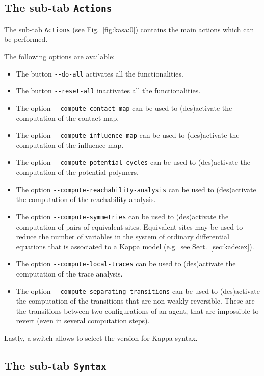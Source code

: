\documentclass[11pt]{book}
\begin{document}
\subsection{The sub-tab \texttt{Actions}}

The sub-tab \texttt{Actions} (see Fig.~\ref{fig:kasa:0}) contains the main actions which can be performed.

The following options are available:
\begin{itemize}
\item The button \texttt{-{}-do-all} activates all the functionalities.
\item The button \texttt{-{}-reset-all} inactivates all the functionalities.
\item The option \texttt{-{}-compute-contact-map} can be used to (des)activate the computation of the contact map.
\item The option \texttt{-{}-compute-influence-map} can be used to (des)activate the computation of the influence map.
\item The option \texttt{-{}-compute-potential-cycles} can be used to (des)activate the computation of the potential polymers.
\item The option \texttt{-{}-compute-reachability-analysis} can be used to (des)activate the computation of the reachability analysis.
\item The option \texttt{-{}-compute-symmetries} can be used to (des)activate the computation of pairs of equivalent sites. Equivalent sites may be used to reduce the number of variables in the system of ordinary differential equations that is associated to a Kappa model (e.g.~see Sect.~\ref{sec:kade:ex}).
\item The option \texttt{-{}-compute-local-traces} can be used to (des)activate the computation of the trace analysis.
\item The option \texttt{-{}-compute-separating-transitions} can be used to (des)activate the computation of the transitions that are non weakly
reversible. These are the transitions between two configurations of an agent, that are impossible to revert (even in several computation steps).
\end{itemize}

Lastly, a switch allows to select the version for Kappa syntax.

\subsection{The sub-tab \texttt{Syntax}}
\end{document}
